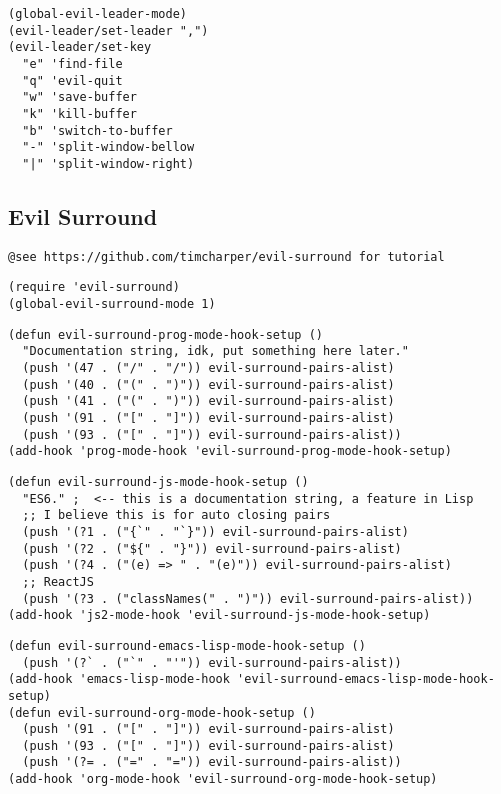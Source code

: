 \documentclass[11pt]{article}
\begin{document}
\begin{verbatim}
(global-evil-leader-mode)
(evil-leader/set-leader ",")
(evil-leader/set-key
  "e" 'find-file
  "q" 'evil-quit
  "w" 'save-buffer
  "k" 'kill-buffer
  "b" 'switch-to-buffer
  "-" 'split-window-bellow
  "|" 'split-window-right)
\end{verbatim}

\subsection*{Evil Surround}
\label{sec:orgcdb88de}
\begin{verbatim}
@see https://github.com/timcharper/evil-surround for tutorial
\end{verbatim}


\begin{verbatim}
(require 'evil-surround)
(global-evil-surround-mode 1)
\end{verbatim}

\begin{verbatim}
(defun evil-surround-prog-mode-hook-setup ()
  "Documentation string, idk, put something here later."
  (push '(47 . ("/" . "/")) evil-surround-pairs-alist)
  (push '(40 . ("(" . ")")) evil-surround-pairs-alist)
  (push '(41 . ("(" . ")")) evil-surround-pairs-alist)
  (push '(91 . ("[" . "]")) evil-surround-pairs-alist)
  (push '(93 . ("[" . "]")) evil-surround-pairs-alist))
(add-hook 'prog-mode-hook 'evil-surround-prog-mode-hook-setup)
\end{verbatim}

\begin{verbatim}
(defun evil-surround-js-mode-hook-setup ()
  "ES6." ;  <-- this is a documentation string, a feature in Lisp
  ;; I believe this is for auto closing pairs
  (push '(?1 . ("{`" . "`}")) evil-surround-pairs-alist)
  (push '(?2 . ("${" . "}")) evil-surround-pairs-alist)
  (push '(?4 . ("(e) => " . "(e)")) evil-surround-pairs-alist)
  ;; ReactJS
  (push '(?3 . ("classNames(" . ")")) evil-surround-pairs-alist))
(add-hook 'js2-mode-hook 'evil-surround-js-mode-hook-setup)
\end{verbatim}

\begin{verbatim}
(defun evil-surround-emacs-lisp-mode-hook-setup ()
  (push '(?` . ("`" . "'")) evil-surround-pairs-alist))
(add-hook 'emacs-lisp-mode-hook 'evil-surround-emacs-lisp-mode-hook-setup)
(defun evil-surround-org-mode-hook-setup ()
  (push '(91 . ("[" . "]")) evil-surround-pairs-alist)
  (push '(93 . ("[" . "]")) evil-surround-pairs-alist)
  (push '(?= . ("=" . "=")) evil-surround-pairs-alist))
(add-hook 'org-mode-hook 'evil-surround-org-mode-hook-setup)
\end{verbatim}
\end{document}
